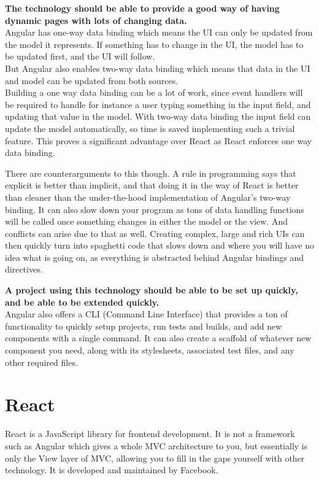 \documentclass{report}
\begin{document}
	\textbf{The technology should be able to provide a good way of having dynamic pages with lots of changing data.} \\
	Angular has one-way data binding which means the UI can only be updated from the model it represents. If something has to change in the UI, the model has to be updated first, and the UI will follow.\\
	But Angular also enables two-way data binding which means that data in the UI and model can be updated from both sources.\\
	Building a one way data binding can be a lot of work, since event handlers will be required to handle for instance a user typing something in the input field, and updating that value in the model.
	With two-way data binding the input field can update the model automatically, so time is saved implementing such a trivial feature.
	This proves a significant advantage over React as React enforces one way data binding.
	
	There are counterarguments to this though. A rule in programming says that explicit is better than implicit, and that doing it in the way of React is better than cleaner than the under-the-hood implementation of Angular's two-way binding. It can also slow down your program as tons of data handling functions will be called once something changes in either the model or the view. And conflicts can arise due to that as well. Creating complex, large and rich UIs can then quickly turn into spaghetti code that slows down and where you will have no idea what is going on, as everything is abstracted behind Angular bindings and directives.
	
	\textbf{A project using this technology should be able to be set up quickly, and be able to be extended quickly.} \\
	Angular also offers a CLI (Command Line Interface) that provides a ton of functionality to quickly setup projects, run tests and builds, and add new components with a single command. It can also create a scaffold of whatever new component you need, along with its stylesheets, associated test files, and any other required files.
	
	\chapter{React}
	React is a JavaScript library for frontend development. It is not a framework such as Angular which gives a whole MVC architecture to you, but essentially is only the View layer of MVC, allowing you to fill in the gaps yourself with other technology. It is developed and maintained by Facebook. 
	
\end{document}
